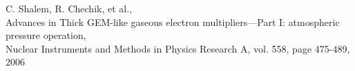 \documentclass[12pt, a4paper,titlepage]{article}
\numberwithin{equation}{section}
\numberwithin{figure}{section}
\begin{document}
 
\pagebreak

\begin{thebibliography}{99}

 C. Shalem, R. Chechik, et al.,\\
Advances in Thick GEM-like gaseous electron multipliers—Part I: atmospheric pressure operation,\\
Nuclear Instruments and Methods in Physics Research A, vol. 558, page 475-489, 2006

\end{thebibliography}

\pagebreak
\end{document}

